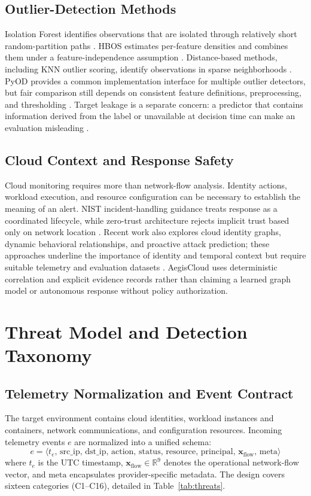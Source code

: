 \documentclass[conference]{IEEEtran}
\begin{document}
\subsection{Outlier-Detection Methods}
Isolation Forest identifies observations that are isolated through relatively short random-partition paths \cite{liu2008isolation}. HBOS estimates per-feature densities and combines them under a feature-independence assumption \cite{goldstein2012hbos}. Distance-based methods, including KNN outlier scoring, identify observations in sparse neighborhoods \cite{ramaswamy2000efficient}. PyOD provides a common implementation interface for multiple outlier detectors, but fair comparison still depends on consistent feature definitions, preprocessing, and thresholding \cite{zhao2019pyod}. Target leakage is a separate concern: a predictor that contains information derived from the label or unavailable at decision time can make an evaluation misleading \cite{kaufman2012leakage}.

\subsection{Cloud Context and Response Safety}
Cloud monitoring requires more than network-flow analysis. Identity actions, workload execution, and resource configuration can be necessary to establish the meaning of an alert. NIST incident-handling guidance treats response as a coordinated lifecycle, while zero-trust architecture rejects implicit trust based only on network location \cite{nist80061,nist800207}. Recent work also explores cloud identity graphs, dynamic behavioral relationships, and proactive attack prediction; these approaches underline the importance of identity and temporal context but require suitable telemetry and evaluation datasets \cite{madireddy2025iam,thaqi2026ddos,nandan2026gnn}. AegisCloud uses deterministic correlation and explicit evidence records rather than claiming a learned graph model or autonomous response without policy authorization.

\section{Threat Model and Detection Taxonomy}
\subsection{Telemetry Normalization and Event Contract}
The target environment contains cloud identities, workload instances and containers, network communications, and configuration resources. Incoming telemetry events $e$ are normalized into a unified schema:
\begin{equation}
e = \langle t_e, \, \mathrm{src\_ip}, \, \mathrm{dst\_ip}, \, \mathrm{action}, \, \mathrm{status}, \, \mathrm{resource}, \, \mathrm{principal}, \, \mathbf{x}_{\mathrm{flow}}, \, \mathrm{meta} \rangle
\end{equation}
where $t_e$ is the UTC timestamp, $\mathbf{x}_{\mathrm{flow}} \in \mathbb{R}^9$ denotes the operational network-flow vector, and $\mathrm{meta}$ encapsulates provider-specific metadata. The design covers sixteen categories (C1--C16), detailed in Table~\ref{tab:threats}.
\end{document}
